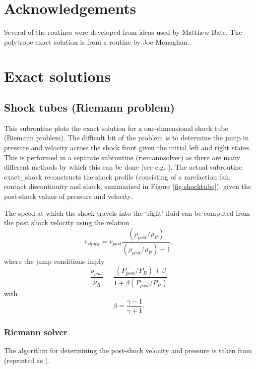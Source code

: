 \documentclass[a4paper,12pt]{article}
\begin{document}
\section*{Acknowledgements}
 Several of the routines were developed from ideas used by Matthew Bate. The
polytrope exact solution is from a routine by Joe Monaghan.

\newpage
\appendix

\section{Exact solutions}
\label{sec:exact}
\subsection{Shock tubes (Riemann problem)}
 This subroutine plots the exact solution for a one-dimensional shock tube
(Riemann problem). The difficult bit of the problem is to determine the jump in
pressure and velocity across the shock front given the initial left and right
states. This is performed in a separate subroutine (riemannsolver) as there are 
many different methods by which this can be done (see e.g. \citealt{toro92}). 
The actual subroutine exact\_shock reconstructs the shock profile (consisting of
a rarefaction fan, contact discontinuity and shock, summarised in Figure
\ref{fig:shocktube}), given the post-shock values of pressure and
velocity. 

 The speed at which the shock travels into the `right' fluid can be computed from the post shock
velocity using the relation
\begin{equation}
v_{shock} = v_{post}\frac{(\rho_{post}/\rho_R)}{(\rho_{post}/\rho_R)- 1},
\end{equation}
where the jump conditions imply
\begin{equation}
\frac{\rho_{post}}{\rho_R} = \frac{(P_{post}/P_R) + \beta}{1 + \beta (P_{post}/P_R)}
\end{equation}
with
\begin{equation}
\beta = \frac{\gamma - 1}{\gamma + 1}.
\end{equation}

\subsubsection{Riemann solver}
 The algorithm for determining the post-shock velocity and pressure is taken
from \citet{vanleer79} (reprinted as \citealt{vanleer99}).
\end{document}
